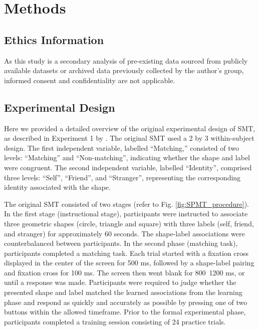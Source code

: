 \documentclass[sn-apa]{sn-jnl}%
\theoremstyle{thmstyleone}%
\theoremstyle{thmstyletwo}%
\theoremstyle{thmstylethree}%
\begin{document}
\section{Methods}\label{sec:method}

\subsection{Ethics Information}\label{subsec:ethics}

As this study is a secondary analysis of pre-existing data sourced from publicly available datasets or archived data previously collected by the author’s group, informed consent and confidentiality are not applicable. 

\subsection{Experimental Design}\label{subsec:experimentdesign}


Here we provided a detailed overview of the original experimental design of SMT, as described in Experiment 1 by \textcite{sui2012perceptual}. The original SMT used a 2 by 3 within-subject design. The first independent variable, labelled “Matching,” consisted of two levels: ``Matching” and ``Non-matching”, indicating whether the shape and label were congruent. The second independent variable, labelled “Identity”, comprised three levels: ``Self”, ``Friend”, and ``Stranger”, representing the corresponding identity associated with the shape. 

The original SMT consisted of two stages (refer to Fig. \ref{fig:SPMT_procedure}). In the first stage (instructional stage), participants were instructed to associate three geometric shapes (circle, triangle and square) with three labels (self, friend, and stranger) for approximately 60 seconds. The shape-label associations were counterbalanced between participants. In the second phase (matching task), participants completed a matching task. Each trial started with a fixation cross displayed in the center of the screen for 500 ms, followed by a shape-label pairing and fixation cross for 100 ms. The screen then went blank for 800~1200 ms, or until a response was made. Participants were required to judge whether the presented shape and label matched the learned associations from the learning phase and respond as quickly and accurately as possible by pressing one of two buttons within the allowed timeframe. Prior to the formal experimental phase, participants completed a training session consisting of 24 practice trials. 
\end{document}
